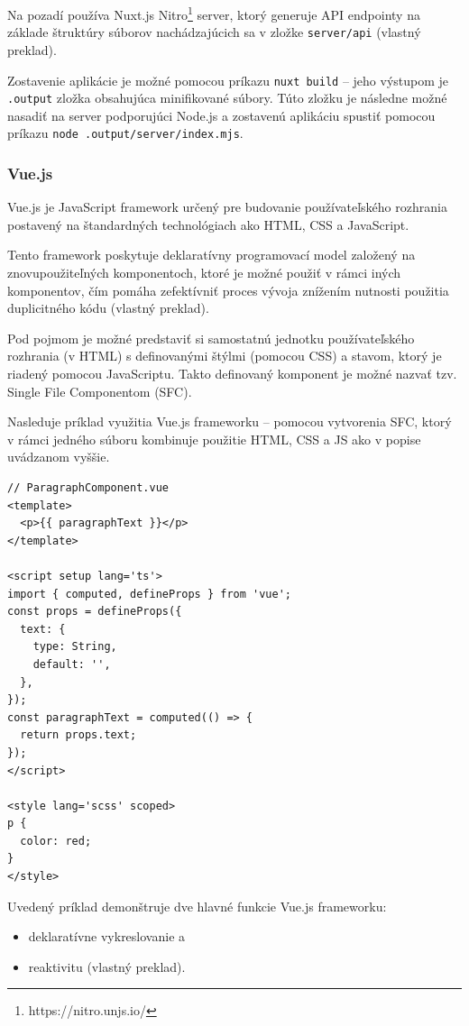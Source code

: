 Na pozadí používa Nuxt.js Nitro\footnote{https://nitro.unjs.io/} server, ktorý generuje API endpointy na základe štruktúry súborov nachádzajúcich sa v zložke \texttt{server/api} \cite{nuxt_introduction} (vlastný preklad).

Zostavenie aplikácie je možné pomocou príkazu \texttt{nuxt build} -- jeho výstupom je \texttt{.output} zložka obsahujúca minifikované súbory. Túto zložku je následne možné nasadiť na server podporujúci Node.js a zostavenú aplikáciu spustiť pomocou príkazu \texttt{node .output/server/index.mjs}.

\subsubsection {Vue.js}
Vue.js je JavaScript framework určený pre budovanie používateľského rozhrania postavený na štandardných technológiach ako HTML, CSS a JavaScript.

Tento framework poskytuje deklaratívny programovací model založený na znovupoužiteľných komponentoch, ktoré je možné použiť v rámci iných komponentov, čím pomáha zefektívniť proces vývoja znížením nutnosti použitia duplicitného kódu \cite{vuejs_introduction} (vlastný preklad).

Pod pojmom  je možné predstaviť si samostatnú jednotku používateľského rozhrania (v HTML) s definovanými štýlmi (pomocou CSS) a stavom, ktorý je riadený pomocou JavaScriptu.
Takto definovaný komponent je možné nazvať tzv. Single File Componentom (SFC).

Nasleduje príklad využitia Vue.js frameworku -- pomocou vytvorenia SFC, ktorý v rámci jedného súboru kombinuje použitie HTML, CSS a JS ako v popise uvádzanom vyššie.

\clearpage
\begin{minipage}[]{\linewidth}
\begin{verbatim}
// ParagraphComponent.vue
<template>
  <p>{{ paragraphText }}</p>
</template>

<script setup lang='ts'>
import { computed, defineProps } from 'vue';
const props = defineProps({
  text: {
    type: String,
    default: '',
  },
});
const paragraphText = computed(() => {
  return props.text;
});
</script>

<style lang='scss' scoped>
p {
  color: red;
}
</style>
\end{verbatim}
\end{minipage}

Uvedený príklad demonštruje dve hlavné funkcie Vue.js frameworku:
\begin {itemize}
\item {deklaratívne vykreslovanie a}
\item {reaktivitu \cite{vuejs_introduction} (vlastný preklad).}
\end {itemize}

